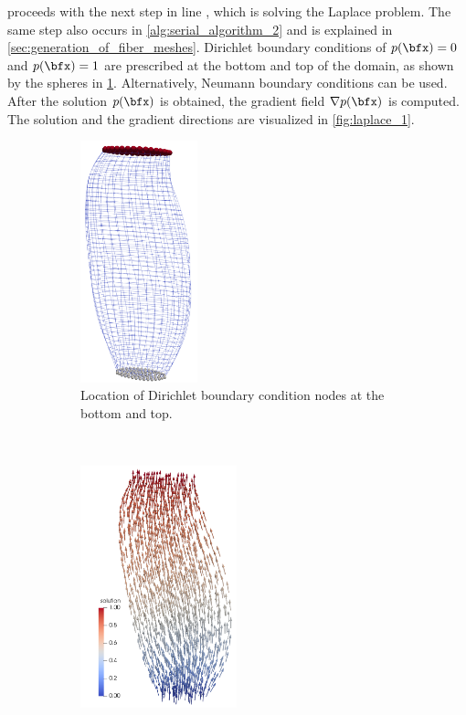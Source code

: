  proceeds with the next step in line , which is solving the Laplace problem.
The same step also occurs in \cref{alg:serial_algorithm_2} and is explained in \cref{sec:generation_of_fiber_meshes}.
Dirichlet boundary conditions of $p(\bfx) = 0$ and $p(\bfx) = 1$ are prescribed at the bottom and top of the domain, as shown by the spheres in \cref{fig:dirichlet_bc_1}. Alternatively, Neumann boundary conditions can be used. After the solution $p(\bfx)$ is obtained, the gradient field $\nabla p(\bfx)$ is computed. The solution and the gradient directions are visualized in \cref{fig:laplace_1}.

\begin{figure}
  \centering
  \begin{subfigure}[t]{0.23\textwidth}%
    \centering%
    \includegraphics[height=7cm]{images/parallel_fiber_estimation/dirichlet_bc_1.png}
    \caption{Location of Dirichlet boundary condition nodes at the bottom and top.}%
    \label{fig:dirichlet_bc_1}%
  \end{subfigure}
  \,
  \begin{subfigure}[t]{0.24\textwidth}%
    \centering%
    \includegraphics[height=7cm]{images/parallel_fiber_estimation/laplace_1.png}

\end{subfigure}
\end{figure}
